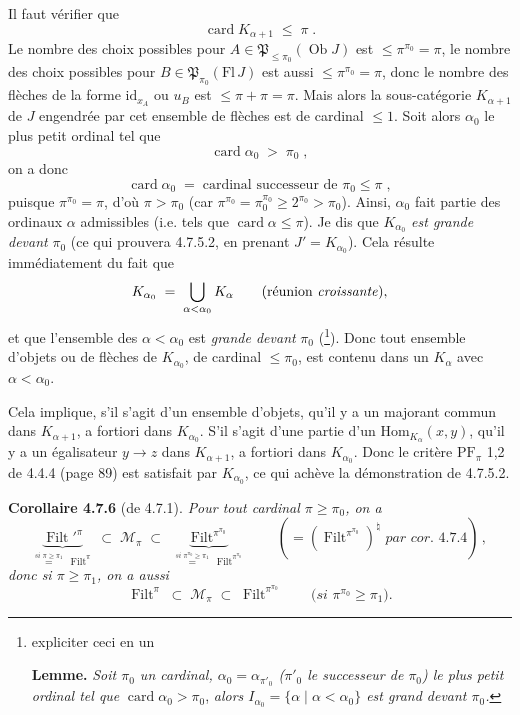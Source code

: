 \documentclass[11pt]{article}
\newcommand{\printedpage}[1]{\marginpar{\footnotesize p.~#1}}
\newcommand{\msp}[1]{\marginpar{\footnotesize [#1]}}
\newcommand{\Filt}{\operatorname{Filt}}
\newcommand{\card}{\operatorname{card}}
\newcommand{\Ob}{\operatorname{Ob}}
\begin{document}
Il faut vérifier que
\[
\card K_{\alpha+1} \;\leqslant\; \pi \;.
\]
Le nombre des choix possibles pour $A \in \mathfrak{P}_{\leqslant \pi_0}(\Ob J)$ \msp{page 170} est $\leqslant \pi^{\pi_0} = \pi$, le nombre des choix possibles pour $B \in \mathfrak{P}_{\pi_0}(\mathrm{Fl}\, J)$ est aussi $\leqslant \pi^{\pi_0} = \pi$, donc le nombre des flèches de la forme $\mathrm{id}_{x_A}$ ou $u_B$ est $\leqslant \pi + \pi = \pi$. Mais alors la sous-catégorie $K_{\alpha+1}$ de $J$ engendrée par cet ensemble de flèches est de cardinal $\leqslant 1$. Soit alors %
\printedpage{57}
$\alpha_0$ le plus petit ordinal tel que
\[
\card \alpha_0 \;>\; \pi_0 \;,
\]
on a donc
\[
\card \alpha_0 \;=\; \text{cardinal successeur de } \pi_0 \leqslant \pi \;,
\]
puisque $\pi^{\pi_0} = \pi$, d’où $\pi > \pi_0$ (car $\pi^{\pi_0} = \pi_0^{\pi_0} \geqslant 2^{\pi_0} > \pi_0$). Ainsi, $\alpha_0$ fait partie des ordinaux $\alpha$ admissibles (i.e. tels que $\card \alpha \leqslant \pi$). Je dis que $K_{\alpha_0}$ \textit{est grande devant} $\pi_0$ (ce qui prouvera 4.7.5.2, en prenant $J' = K_{\alpha_0}$). Cela résulte immédiatement du fait que
\[
K_{\alpha_0} \;=\; \bigcup_{\alpha < \alpha_0} K_{\alpha} \qquad (\text{réunion \textit{croissante}}),
\]
et que l’ensemble des $\alpha < \alpha_0$ est \textit{grande devant} $\pi_0$ (\footnote[71]{expliciter ceci en un

\textbf{Lemme.} \textit{Soit $\pi_0$ un cardinal, $\alpha_0 = \alpha_{\pi'_0}$ ($\pi'_0$ le successeur de $\pi_0$) le plus petit ordinal tel que} $\card \alpha_0 > \pi_0$, \textit{alors $I_{\alpha_0} = \{\alpha \mid \alpha < \alpha_0\}$ est grand devant $\pi_0$.}}). Donc tout ensemble d’objets ou de flèches de $K_{\alpha_0}$, de cardinal $\leqslant \pi_0$, est contenu dans un $K_{\alpha}$ avec $\alpha < \alpha_0$.

\msp{page 171}
Cela implique, s’il s’agit d’un ensemble d’objets, qu’il y a un majorant commun dans $K_{\alpha+1}$, a fortiori dans $K_{\alpha_0}$. S’il s’agit d’une partie d’un $\mathrm{Hom}_{K_{\alpha}}(x,y)$, qu’il y a un égalisateur $y \longrightarrow z$ dans $K_{\alpha+1}$, a fortiori dans $K_{\alpha_0}$. Donc le critère $\mathrm{PF}_{\pi}$ 1,2 de 4.4.4 (page 89) est satisfait par $K_{\alpha_0}$, ce qui achève la démonstration de 4.7.5.2.

\textbf{Corollaire 4.7.6} (de 4.7.1). \textit{Pour tout cardinal $\pi \geqslant \pi_0$, on a}
\[
\underbrace{\Filt'^{\pi}}_{\overset{\textit{si } \pi \geqslant \pi_1}{=}\ \Filt^{\pi}} \;\subset\; \mathcal{M}_{\pi} \;\subset\; \underbrace{\Filt^{\pi^{\pi_0}}}_{\overset{\textit{si } \pi^{\pi_0} \geqslant \pi_1}{=}\ \Filt^{\pi^{\pi_0}}} \qquad (= (\Filt^{\pi^{\pi_0}})^{\natural} \textit{ par cor. 4.7.4})\,, \tag*{(4.7.6.1)} %
\]
\textit{donc si $\pi \geqslant \pi_1$, on a aussi}
\[
\Filt^{\pi} \;\subset\; \mathcal{M}_{\pi} \;\subset\; \Filt^{\pi^{\pi_0}} \qquad \textit{(si $\pi^{\pi_0} \geqslant \pi_1$).} \tag*{(4.7.6.2)}
\]
\end{document}
